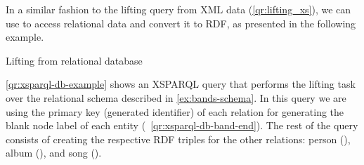 In a similar fashion to the lifting query from \ac{XML} data (\cref{qr:lifting_xs}), we can use  to
access relational data and convert it to \ac{RDF}, as presented in the following example.
%
\begin{query}[t]
  \centering
  \caption{Lifting from relational database}%
  \label{qr:xsparql-db-example}%
\end{query}
%
\begin{example}
  \label{ex:xsparql-rdb}
  \cref{qr:xsparql-db-example} shows an XSPARQL query that performs the lifting task over the relational schema
  described in \cref{ex:bands-schema}.
  In this query we are using the primary key (generated identifier) of each relation for generating the blank node label
  of each entity (\cf~\cref{qr:xsparql-db-band-end}).
  The rest of the query consists of creating the respective \ac{RDF} triples for the other relations: person
  (), album
  (), and song
  ().
\end{example}






